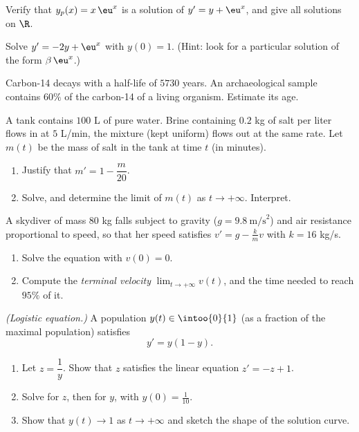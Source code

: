 \begin{exercise}[$\star$]\label{exo:tle:diffeq:3}
Verify that $y_p(x) = x\,\eu^{x}$ is a solution of $y' = y + \eu^x$, and
give all solutions on $\R$.
\end{exercise}

\begin{exercise}[$\star\star$]\label{exo:tle:diffeq:4}
Solve $y' = -2y + \eu^{x}$ with $y(0) = 1$.
(Hint: look for a particular solution of the form $\beta\,\eu^{x}$.)
\end{exercise}

\begin{exercise}[$\star\star$]\label{exo:tle:diffeq:5}
Carbon-14 decays with a half-life of $5730$ years. An archaeological sample
contains $60\%$ of the carbon-14 of a living organism. Estimate its age.
\end{exercise}

\begin{exercise}[$\star\star$]\label{exo:tle:diffeq:6}
A tank contains $100$ L of pure water. Brine containing $0.2$ kg of salt per
liter flows in at $5$ L/min, the mixture (kept uniform) flows out at the same
rate. Let $m(t)$ be the mass of salt in the tank at time $t$ (in minutes).
\begin{enumerate}
  \item Justify that $m' = 1 - \dfrac{m}{20}$.
  \item Solve, and determine the limit of $m(t)$ as $t \to +\infty$.
        Interpret.
\end{enumerate}
\end{exercise}

\begin{exercise}[$\star\star$]\label{exo:tle:diffeq:7}
A skydiver of mass $80$ kg falls subject to gravity
($g = 9.8\ \text{m/s}^2$) and air resistance proportional to speed, so that
her speed satisfies $v' = g - \frac{k}{m}v$ with $k = 16$ kg/s.
\begin{enumerate}
  \item Solve the equation with $v(0) = 0$.
  \item Compute the \emph{terminal velocity} $\lim_{t\to+\infty} v(t)$, and
        the time needed to reach $95\%$ of it.
\end{enumerate}
\end{exercise}

\begin{exercise}[$\star\star\star$]\label{exo:tle:diffeq:8}
\emph{(Logistic equation.)} A population $y(t) \in \intoo{0}{1}$ (as a
fraction of the maximal population) satisfies
\[
y' = y(1 - y).
\]
\begin{enumerate}
  \item Let $z = \dfrac{1}{y}$. Show that $z$ satisfies the linear equation
        $z' = -z + 1$.
  \item Solve for $z$, then for $y$, with $y(0) = \frac{1}{10}$.
  \item Show that $y(t) \to 1$ as $t \to +\infty$ and sketch the shape of
        the solution curve.
\end{enumerate}
\end{exercise}

